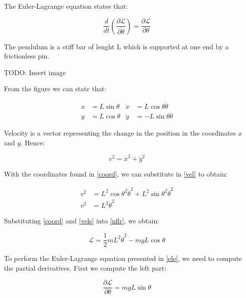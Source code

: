 The Euler-Lagrange equation states that:

\begin{equation} \label{ele}
	\frac{d}{dt}\left( \frac{\partial\mathcal{L}}{\partial\dot{\theta}} \right)=\frac{\partial\mathcal{L}}{\partial\theta}
\end{equation}

The pendulum is a stiff bar of lenght L which is supported at one end by a frictionless pin.

TODO: Insert image

From the figure we can state that:

\begin{equation} \label{coord}
	\begin{aligned}
		x&=L\sin{\theta} & \dot{x}&=L\cos{\theta}\dot{\theta}\\
		y&=L\cos{\theta} & \dot{y}&=-L\sin{\theta}\dot{\theta}
	\end{aligned}
\end{equation}

Velocity is a vector representing the change in the position in the coordinates $x$ and $y$. Hence:

\begin{equation} \label{vel}
	v^2=\dot{x}^2+\dot{y}^2
\end{equation}

With the coordinates found in \ref{coord}, we can substitute in \ref{vel} to obtain:

\begin{equation} \label{vels}
	\begin{split}
		v^2&=L^2\cos{\theta}^2\dot{\theta}^2+L^2\sin{\theta}^2\dot{\theta}^2\\
		v^2&=L^2\dot{\theta}^2
	\end{split}
\end{equation}

Substituting \ref{coord} and \ref{vels} into \ref{nflr}, we obtain:

\begin{equation} \label{les}
	\mathcal{L}=\frac{1}{2}mL^2\dot{\theta}^2-mgL\cos{\theta}
\end{equation}

To perform the Euler-Lagrange equation presented in \ref{ele}, we need to compute the partial derivatives. First we compute the left part:

\begin{equation} \label{dlrt}
	\frac{\partial\mathcal{L}}{\partial\theta}=mgL\sin{\theta}
\end{equation}

